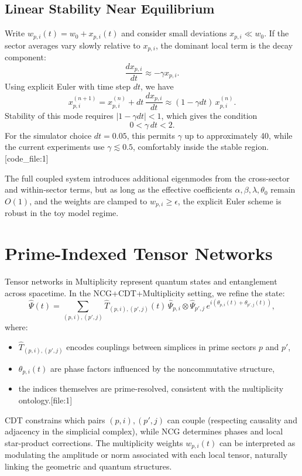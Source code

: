 \documentclass[11pt]{article}
\begin{document}
\subsection{Linear Stability Near Equilibrium}

Write \(w_{p,i}(t) = w_0 + x_{p,i}(t)\) and consider small deviations
\(x_{p,i} \ll w_0\). If the sector averages vary slowly relative to
\(x_{p,i}\), the dominant local term is the decay component:
\begin{equation}
  \frac{dx_{p,i}}{dt} \approx -\gamma x_{p,i}.
\end{equation}
Using explicit Euler with time step \(dt\), we have
\begin{equation}
  x^{(n+1)}_{p,i} =
    x^{(n)}_{p,i} + dt\,\frac{dx_{p,i}}{dt}
    \approx (1 - \gamma dt)\,x^{(n)}_{p,i}.
\end{equation}
Stability of this mode requires \(|1 - \gamma dt| < 1\), which gives the
condition
\begin{equation}
  0 < \gamma\,dt < 2.
\end{equation}
For the simulator choice \(dt = 0.05\), this permits \(\gamma\) up to
approximately 40, while the current experiments use \(\gamma \lesssim 0.5\),
comfortably inside the stable region.[code_file:1]

The full coupled system introduces additional eigenmodes from the
cross-sector and within-sector terms, but as long as the effective
coefficients \(\alpha, \beta, \lambda,\theta_0\) remain \(O(1)\), and the
weights are clamped to \(w_{p,i} \geq \epsilon\), the explicit Euler scheme
is robust in the toy model regime.

\section{Prime-Indexed Tensor Networks}

Tensor networks in Multiplicity represent quantum states and entanglement
across spacetime. In the NCG+CDT+Multiplicity setting, we refine the
state:
\begin{equation}
  \hat{\Psi}(t) =
    \sum_{(p,i),(p',j)}
      \hat{T}_{(p,i),(p',j)}(t)\,
      \hat{\Psi}_{p,i} \otimes \hat{\Psi}_{p',j}\,
      e^{i(\theta_{p,i}(t) + \theta_{p',j}(t))},
\end{equation}
where:
\begin{itemize}
  \item \(\hat{T}_{(p,i),(p',j)}\) encodes couplings between simplices in
        prime sectors \(p\) and \(p'\),
  \item \(\theta_{p,i}(t)\) are phase factors influenced by the
        noncommutative structure,
  \item the indices themselves are prime-resolved, consistent with the
        multiplicity ontology.[file:1]
\end{itemize}
CDT constrains which pairs \((p,i),(p',j)\) can couple (respecting
causality and adjacency in the simplicial complex), while NCG determines
phases and local star-product corrections. The multiplicity weights
\(w_{p,i}(t)\) can be interpreted as modulating the amplitude or norm
associated with each local tensor, naturally linking the geometric and
quantum structures.
\end{document}
